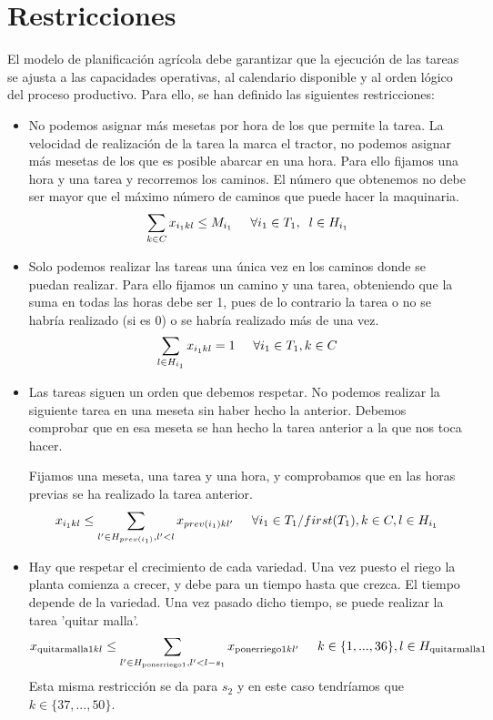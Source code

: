 \section*{Restricciones}
El modelo de planificación agrícola debe garantizar que la ejecución de las tareas se ajusta a las capacidades operativas,
al calendario disponible y al orden lógico del proceso productivo. Para ello, se han definido las siguientes restricciones:
\begin{itemize}
    \item  No podemos asignar más mesetas por hora de los que permite la tarea.
           La velocidad de realización de la tarea la marca el tractor, no podemos asignar más mesetas de los que es posible abarcar en una hora.
           Para ello fijamos una hora y una tarea y recorremos los caminos. El número que obtenemos no debe ser mayor que el máximo número de caminos que puede hacer la maquinaria. 
	    \[
            \sum_{k\in C}x_{i_1 kl} \leq M_{i_1} \hspace{0.5cm} \forall i_1 \in T_1, \hspace{0.2cm} l\in H_{i_1}
        \]
    \item  Solo podemos realizar las tareas una única vez en los caminos donde se puedan realizar.
           Para ello fijamos un camino y una tarea, obteniendo que la suma en todas las horas debe ser 1,
           pues de lo contrario la tarea o no se habría realizado (si es 0) o se habría realizado más de una vez. 
        \[
	        \sum_{l\in H_{i_1}}x_{i_1 kl} =1 \hspace{0.5cm} \forall i_1 \in T_1 , k \in C
        \]
    \item Las tareas siguen un orden que debemos respetar.
          No podemos realizar la siguiente tarea en una meseta sin haber hecho la anterior.
          Debemos comprobar que en esa meseta se han hecho la tarea anterior a la que nos toca hacer. 
	
	      Fijamos una meseta, una tarea y una hora, y comprobamos que en las horas previas se ha realizado la tarea anterior. 
        \[
	        x_{i_1 kl} \leq \sum_{l' \in H_{prev(i_1)}, l'<l}x_{prev(i_1)kl'} \hspace{0.5cm} \forall i_1\in T_1/{first(T_1)}, k\in C, l \in H_{i_1}
        \]
	
    \item  Hay que respetar el crecimiento de cada variedad. Una vez puesto el riego la planta comienza a crecer,
           y debe para un tiempo hasta que crezca. El tiempo depende de la variedad.
           Una vez pasado dicho tiempo, se puede realizar la tarea 'quitar malla'. 
        \[
	        x_{\text{quitarmalla}1kl} \leq \sum_{l'\in H_{\text{ponerriego}1}, l'<l-s_1}x_{\text{ponerriego}1kl'} \hspace{0.5cm} k\in \{1, ..., 36\}, l\in H_{\text{quitarmalla}1}
        \]
	    Esta misma restricción se da para $s_2$ y en este caso tendríamos que $k \in \{37, ..., 50\}$. 
	

\end{itemize}

